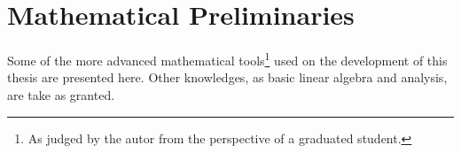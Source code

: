 \chapter{Mathematical Preliminaries}

Some of the more advanced mathematical tools\footnote{As judged by the autor
from the perspective of a graduated student.} used on the development of this
thesis are presented here.
Other knowledges, as basic linear algebra and analysis, are take as granted.

